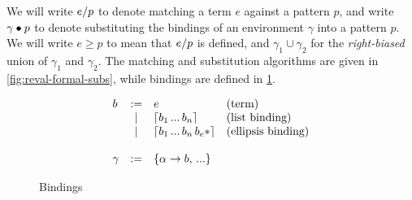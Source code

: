 We will write $e / p$ to denote matching a term $e$ against a
pattern $p$, and write $\gamma \bullet p$ to denote substituting the
bindings of an environment $\gamma$ into a pattern $p$.  We will write
$e \geq p$ to mean that $e / p$ is defined, and $\gamma_1 \cup
\gamma_2$ for the \emph{right-biased} union of $\gamma_1$ and
$\gamma_2$. The matching and substitution algorithms are given in
\cref{fig:reval-formal-subs}, while bindings are defined in
\cref{fig:reval-formal-bind}.

\begin{figure}[t]
\[\begin{array}{lcll}
b &:=& e                &\text{(term)} \\
  &|&  \lceil b_1 \,...\, b_n \rceil  &\text{(list binding)} \\
  &|&  \lceil b_1 \,...\, b_n\,b_e* \rceil &\text{(ellipsis binding)} \\ \\
\gamma &:=& \{\alpha \to b,\,...\} \\
\end{array}\]
\caption{Bindings}
\label{fig:reval-formal-bind}
\end{figure}

